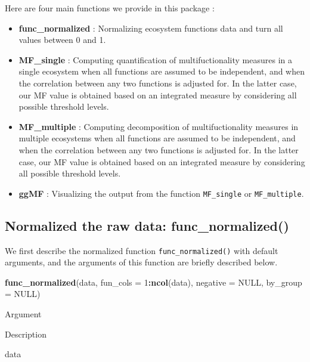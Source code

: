 \documentclass[
]{article}
\newenvironment{Shaded}{\begin{snugshade}}{\end{snugshade}}
\newcommand{\AttributeTok}[1]{\textcolor[rgb]{0.13,0.29,0.53}{#1}}
\newcommand{\ConstantTok}[1]{\textcolor[rgb]{0.56,0.35,0.01}{#1}}
\newcommand{\DecValTok}[1]{\textcolor[rgb]{0.00,0.00,0.81}{#1}}
\newcommand{\FunctionTok}[1]{\textcolor[rgb]{0.13,0.29,0.53}{\textbf{#1}}}
\newcommand{\NormalTok}[1]{#1}
\newcommand{\SpecialCharTok}[1]{\textcolor[rgb]{0.81,0.36,0.00}{\textbf{#1}}}
\providecommand{\tightlist}{%
  \setlength{\itemsep}{0pt}\setlength{\parskip}{0pt}}
\begin{document}
Here are four main functions we provide in this package :

\begin{itemize}
\tightlist
\item
  \textbf{func\_normalized} : Normalizing ecosystem functions data and
  turn all values between 0 and 1.
\item
  \textbf{MF\_single} : Computing quantification of multifuctionality
  measures in a single ecosystem when all functions are assumed to be
  independent, and when the correlation between any two functions is
  adjusted for. In the latter case, our MF value is obtained based on an
  integrated measure by considering all possible threshold levels.
\item
  \textbf{MF\_multiple} : Computing decomposition of multifuctionality
  measures in multiple ecosystems when all functions are assumed to be
  independent, and when the correlation between any two functions is
  adjusted for. In the latter case, our MF value is obtained based on an
  integrated measure by considering all possible threshold levels.
\item
  \textbf{ggMF} : Visualizing the output from the function
  \texttt{MF\_single} or \texttt{MF\_multiple}.
\end{itemize}

\hypertarget{normalized-the-raw-data-func_normalized}{%
\subsection{Normalized the raw data:
func\_normalized()}\label{normalized-the-raw-data-func_normalized}}

We first describe the normalized function \texttt{func\_normalized()}
with default arguments, and the arguments of this function are briefly
described below.

\begin{Shaded}
\begin{Highlighting}[]
\FunctionTok{func\_normalized}\NormalTok{(data, }\AttributeTok{fun\_cols =} \DecValTok{1}\SpecialCharTok{:}\FunctionTok{ncol}\NormalTok{(data), }\AttributeTok{negative =} \ConstantTok{NULL}\NormalTok{, }\AttributeTok{by\_group =} \ConstantTok{NULL}\NormalTok{) }
\end{Highlighting}
\end{Shaded}

Argument

Description

data
\end{document}
